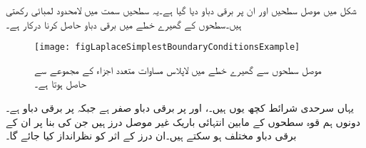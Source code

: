شکل  میں موصل سطحیں اور ان پر برقی دباو دیا گیا ہے۔یہ سطحیں  سمت میں لامحدود لمبائی رکھتی ہیں۔سطحوں کے  گھیرے خطے میں برقی دباو حاصل کرنا درکار ہے۔

\begin{figure}
\centering
\texttt{[image: figLaplaceSimplestBoundaryConditionsExample]}
\caption{موصل سطحوں سے گھیرے خطے میں لاپلاس مساوات متعدد اجزاء کے مجموعے سے حاصل ہوتا ہے۔}
\label{شکل_لاپلاس_متعدد_اجزاء_مجموعہ}
\end{figure} 

یہاں سرحدی شرائط کچھ یوں ہیں۔،  اور  پر برقی دباو صفر ہے جبکہ  پر برقی دباو   ہے۔دونوں ہم قوہ سطحوں کے مابین انتہائی باریک غیر موصل درز ہیں جن کی بنا پر ان کے برقی دباو مختلف ہو سکتے ہیں۔ان درز کے اثر کو نظرانداز کیا جائے گا۔

